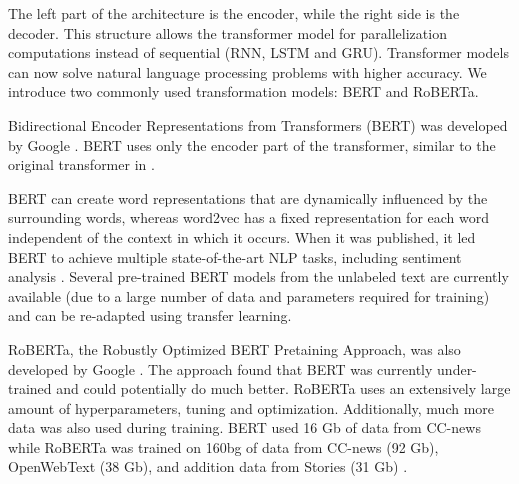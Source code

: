   The left part of the architecture is the encoder, while the right side is the decoder. This structure allows the transformer model for parallelization computations instead of sequential (RNN, LSTM and GRU). Transformer models can now solve natural language processing problems with higher accuracy. We introduce two commonly used transformation models: BERT and RoBERTa. 

  Bidirectional Encoder Representations from Transformers (BERT) was developed by Google \cite{Jacob2018}. BERT uses only the encoder part of the transformer, similar to the original transformer in \cite{Vaswani2017}. 
  
  BERT can create word representations that are dynamically influenced by the surrounding words, whereas word2vec has a fixed representation for each word independent of the context in which it occurs. When it was published, it led BERT to achieve multiple state-of-the-art NLP tasks, including sentiment analysis \cite{Chiorrini2021}. Several pre-trained BERT models from the unlabeled text are currently available (due to a large number of data and parameters required for training) and can be re-adapted using transfer learning. 
  
  RoBERTa, the Robustly Optimized BERT Pretaining Approach, was also developed by Google \cite{Yinhan2019}. The approach found that BERT was currently under-trained and could potentially do much better. RoBERTa uses an extensively large amount of hyperparameters, tuning and optimization. Additionally, much more data was also used during training. BERT used 16 Gb of data from CC-news while RoBERTa was trained on 160bg of data from CC-news (92 Gb), OpenWebText (38 Gb), and addition data from Stories (31 Gb) \cite{Yinhan2019}.
